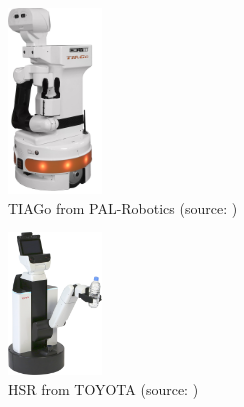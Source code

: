 \begin{figure}[h]
  \centering
  \includegraphics[width=25mm]{images/png/TIAGo.png}
  \caption{TIAGo from PAL-Robotics (source: \cite{TIAGo:online})}
  \label{fig:TIAGo}
\end{figure}
\begin{figure}[h]
  \centering
  \includegraphics[width=25mm]{images/png/HSR.png}
  \caption{HSR from TOYOTA (source: \cite{HSR:online})}
  \label{fig:HSR}
\end{figure}

\newpage